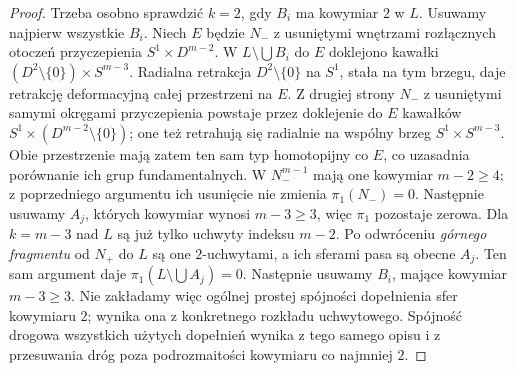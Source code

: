 \begin{proof}
Trzeba osobno sprawdzić
$k=2$, gdy $B_i$ ma
kowymiar $2$ w $L$.
Usuwamy najpierw wszystkie $B_i$.
Niech $E$ będzie $N_-$ z usuniętymi wnętrzami rozłącznych
otoczeń przyczepienia $S^1\times D^{m-2}$.
W $L\setminus\bigcup B_i$ do $E$ doklejono kawałki
$(D^2\setminus\{0\})\times S^{m-3}$.
Radialna retrakcja $D^2\setminus\{0\}$ na $S^1$, stała
na tym brzegu, daje retrakcję deformacyjną całej przestrzeni na $E$.
Z drugiej strony $N_-$ z usuniętymi samymi okręgami przyczepienia
powstaje przez doklejenie do $E$ kawałków
$S^1\times(D^{m-2}\setminus\{0\})$; one też retrahują się
radialnie na wspólny brzeg $S^1\times S^{m-3}$.
Obie przestrzenie mają zatem ten sam typ homotopijny co $E$,
co uzasadnia porównanie ich grup fundamentalnych.
W $N_-^{m-1}$ mają one
kowymiar $m-2\geq4$;
z poprzedniego argumentu
ich usunięcie nie zmienia
$\pi_1(N_-)=0$.
Następnie usuwamy $A_j$,
których kowymiar wynosi
$m-3\geq3$, więc $\pi_1$
pozostaje zerowa.
Dla $k=m-3$ nad $L$ są już tylko uchwyty indeksu $m-2$.
Po odwróceniu \emph{górnego fragmentu} od $N_+$ do $L$
są one $2$-uchwytami, a ich sferami pasa są obecne $A_j$.
Ten sam argument daje $\pi_1(L\setminus\bigcup A_j)=0$.
Następnie usuwamy $B_i$, mające kowymiar $m-3\geq3$.
Nie zakładamy więc ogólnej prostej spójności dopełnienia sfer
kowymiaru $2$; wynika ona z konkretnego rozkładu uchwytowego.
Spójność drogowa wszystkich użytych dopełnień wynika z tego samego
opisu i z przesuwania dróg poza podrozmaitości kowymiaru co najmniej $2$.
\end{proof}

